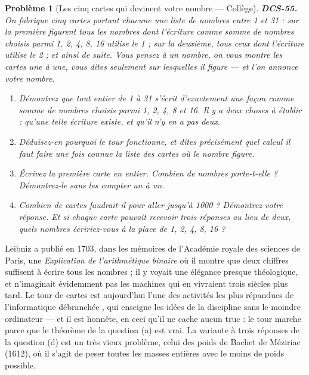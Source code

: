 \documentclass[11pt]{article}
\newtheorem{problem}{Problème}
\begin{document}
\bigskip

\begin{problem}[{Les cinq cartes qui devinent votre nombre --- Collège}]
\textbf{DCS-55.} On fabrique cinq cartes portant chacune une liste de nombres entre 1
et 31 : sur la première figurent tous les nombres dont l'écriture comme somme de nombres
choisis parmi 1, 2, 4, 8, 16 utilise le 1 ; sur la deuxième, tous ceux dont l'écriture
utilise le 2 ; et ainsi de suite. Vous pensez à un nombre, on vous montre les cartes une à
une, vous dites seulement sur lesquelles il figure --- et l'on annonce votre nombre.
\begin{enumerate}
\item[(a)] Démontrez que tout entier de 1 à 31 s'écrit d'exactement une façon comme somme de
nombres choisis parmi 1, 2, 4, 8 et 16. Il y a deux choses à établir : qu'une telle écriture
existe, et qu'il n'y en a pas deux.
\item[(b)] Déduisez-en pourquoi le tour fonctionne, et dites précisément quel calcul il faut faire
une fois connue la liste des cartes où le nombre figure.
\item[(c)] Écrivez la première carte en entier. Combien de nombres porte-t-elle ? Démontrez-le sans
les compter un à un.
\item[(d)] Combien de cartes faudrait-il pour aller jusqu'à 1000 ? Démontrez votre réponse. Et si
chaque carte pouvait recevoir trois réponses au lieu de deux, quels nombres écririez-vous à
la place de 1, 2, 4, 8, 16 ?
\end{enumerate}

\end{problem}

\noindent Leibniz a publié en 1703, dans les mémoires de l'Académie royale des
sciences de Paris, une \textit{Explication de l'arithmétique binaire} où il montre que deux
chiffres suffisent à écrire tous les nombres ; il y voyait une élégance presque théologique,
et n'imaginait évidemment pas les machines qui en vivraient trois siècles plus tard. Le tour
de cartes est aujourd'hui l'une des activités les plus répandues de l'informatique
\og{} débranchée \fg{}, qui enseigne les idées de la discipline sans le moindre ordinateur --- et il
est honnête, en ceci qu'il ne cache aucun truc : le tour marche parce que le théorème de la
question (a) est vrai. La variante à trois réponses de la question (d) est un très vieux
problème, celui des poids de Bachet de Méziriac (1612), où il s'agit de peser toutes les
masses entières avec le moins de poids possible.
\end{document}
